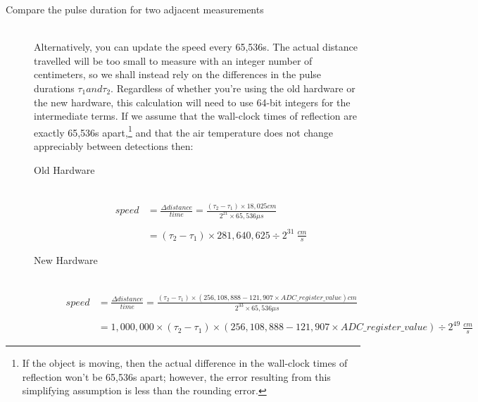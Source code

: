\begin{description}
    \item[Compare the pulse duration for two adjacent measurements] \phantom{ } \\
        Alternatively, you can update the speed every 65,536\textmu s.
        The actual distance travelled will be too small to measure with an integer number of centimeters, so we shall instead rely on the differences in the pulse durations $\tau_1 and \tau_2$.
        Regardless of whether you're using the old hardware or the new hardware, this calculation will need to use 64-bit integers for the intermediate terms.
        If we assume that the wall-clock times of reflection are exactly 65,536\textmu s apart,\footnote{
            If the object is moving, then the actual difference in the wall-clock times of reflection won't be 65,536\textmu s apart; however, the error resulting from this simplifying assumption is less than the rounding error.
        } and that the air temperature does not change appreciably between detections then:
            \begin{description}
                \item[Old Hardware] \phantom{ } \\
                    \begin{align*}
                        speed & = \frac{\Delta distance}{time} %
                          = \frac{\left( \tau_2 - \tau_1 \right) \times 18,025 cm}{2^{21} \times 65,536\mu s} \\
                        & \\
                        & =  \left( \tau_2 - \tau_1 \right) \times 281,640,625 \div 2^{31} \ \frac{cm}{s}
                    \end{align*}
                \item[New Hardware] \phantom{ } \\
                    \begin{align*}
                        speed & = \frac{\Delta distance}{time} = \frac{\left( \tau_2 - \tau_1 \right) \times \left( 256,108,888 - 121,907 \times ADC\_register\_value \right) cm}{2^{33} \times 65,536\mu s} \\
                        & \\
                        & =  1,000,000 \times \left( \tau_2 - \tau_1 \right) \times \left( 256,108,888 - 121,907 \times ADC\_register\_value \right) \div 2^{49} \ \frac{cm}{s}
                    \end{align*}
            \end{description}
\end{description}

